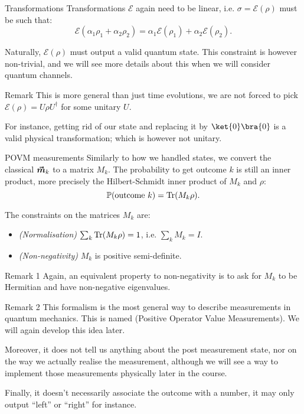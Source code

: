 \documentclass[a4paper]{article}
\begin{document}
\begin{parag}{Transformations}
    Transformations $\mathcal{E}$ again need to be linear, i.e. $\sigma = \mathcal{E}\left(\rho\right)$ must be such that: 
    \[\mathcal{E}\left(\alpha_1 \rho_1 + \alpha_2 \rho_2\right) = \alpha_1 \mathcal{E}\left(\rho_1\right) + \alpha_2 \mathcal{E \left(\rho_2\right)}.\]

    Naturally, $\mathcal{E}\left(\rho\right)$ must output a valid quantum state. This constraint is however non-trivial, and we will see more details about this when we will consider quantum channels.

    \begin{subparag}{Remark}
        This is more general than just time evolutions, we are not forced to pick $\mathcal{E}\left(\rho\right) = U \rho U^{\dagger}$ for some unitary $U$.

        For instance, getting rid of our state and replacing it by $\ket{0}\bra{0}$ is a valid physical transformation; which is however not unitary.
    \end{subparag}
\end{parag}

\begin{parag}{POVM measurements}
    Similarly to how we handled states, we convert the classical $\bm{\protect\vec{m}}_k$ to a matrix $M_k$. The probability to get outcome $k$ is still an inner product, more precisely the Hilbert-Schmidt inner product of $M_k$ and $\rho$: 
    \[\prob\left(\text{outcome $k$}\right) = \Tr\left(M_k \rho\right).\]
    
    The constraints on the matrices $M_k$ are:
    \begin{itemize}
        \item \textit{(Normalisation)} $\sum_{k} \Tr\left(M_k \rho\right) = 1$, i.e. $\sum_{k} M_k = I$.
        \item \textit{(Non-negativity)} $M_k$ is positive semi-definite. 
    \end{itemize}

    \begin{subparag}{Remark 1}
        Again, an equivalent property to non-negativity is to ask for $M_k$ to be Hermitian and have non-negative eigenvalues.
    \end{subparag}
    
    \begin{subparag}{Remark 2}
        This formalism is the most general way to describe measurements in quantum mechanics. This is named  (Positive Operator Value Measurements). We will again develop this idea later.

        Moreover, it does not tell us anything about the post measurement state, nor on the way we actually realise the measurement, although we will see a way to implement those measurements physically later in the course.

        Finally, it doesn't necessarily associate the outcome with a number, it may only output ``left'' or ``right'' for instance. 
    \end{subparag}
\end{parag}
\end{document}
